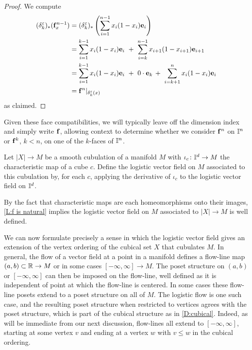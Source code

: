 \begin{proof}
	We compute
	\begin{align*}
		(\delta_{k}^\varepsilon)_*(\mathbf{f}^{n-1}_x) & = (\delta_{k}^\varepsilon)_* \left(\sum_{i=1}^{n-1 } x_{i} (1 - x_{i}) \mathbf{e}_{i} \right) \\ & =
		\sum_{i=1 }^{k-1} x_{i} (1 - x_{i}) \mathbf{e}_{i}\ +\
		\sum_{i=k}^{n-1} x_{i+1} (1 - x_{i+1}) \mathbf{e}_{i+1} \\ & =
		\sum_{i=1}^{k-1} x_{i} (1 - x_{i}) \mathbf{e}_{i}\ +\
		0 \cdot \mathbf{e}_k\, + \
		\sum_{i=k+1}^n x_{i} (1 - x_{i}) \mathbf{e}_{i} \\ & =
		\mathbf{f}^n|_{\delta_k^\varepsilon(x)}
	\end{align*}
	as claimed.
\end{proof}

Given these face compatibilities, we will typically leave off the dimension index and simply write $\mathbf{f}$, allowing context to determine whether we consider $\mathbf{f}^n$ on $\mathbb{I}^n$ or $\mathbf{f}^k$, $k<n$, on one of the $k$-faces of $\mathbb{I}^n$.

\begin{definition}
	Let $|X| \to M$ be a smooth cubulation of a manifold $M$ with $\iota_c \colon \mathbb{I}^d \to M$ the characteristic map of a cube $c$.
	Define the logistic vector field on $M$ associated to this cubulation by, for each $c$, applying the derivative of $\iota_c$ to the logistic vector field on $\mathbb{I}^d$.
\end{definition}

By the fact that characteristic maps are each homeomorphisms onto their images, \cref{L:f is natural} implies the logistic vector field on $M$ associated to $|X| \to M$ is well defined.

We can now formulate precisely a sense in which the logistic vector field gives an extension of the vertex ordering of the cubical set $X$ that cubulates $M$.
In general, the flow of a vector field at a point in a manifold defines a flow-line map $(a,b) \subset \mathbb{R} \to M$ or in some cases $[-\infty, \infty] \to M$.
The poset structure on $(a,b)$ or
$[-\infty, \infty]$ can then be imposed on the flow-line, well defined as it is independent of point at which the flow-line is centered.
In some cases these flow-line posets extend to a poset structure on all of $M$.
The logistic flow is one such case, and the resulting poset structure when restricted to vertices agrees with the poset structure,
which is part of the cubical structure as in
\cref{D:cubical}.
Indeed, as will be immediate from our next discussion,
flow-lines all extend to $[-\infty, \infty]$, starting at some vertex $v$ and ending at a vertex $w$ with $v \leq w$ in the cubical ordering.

